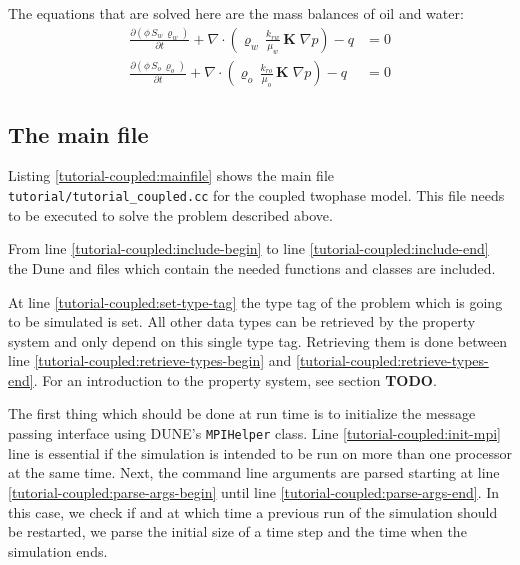 The equations that are solved here are the mass balances of oil and
water:
\begin{align}
  \label{massbalancewater}
  \frac {\partial (\phi \, S_{w}\, \varrho_{w})}{\partial t}
  +
  \nabla \cdot \left( \varrho_{w} \, \frac{k_{rw}}{\mu_{w}} \, \mathbf{K}\;\nabla p \right)
  -
  q
  & =
  0 \\
  \label{massbalanceoil}
  \frac {\partial (\phi \, S_{o}\, \varrho_{o})}{\partial t}
  +
  \nabla \cdot \left( \varrho_{o} \, \frac{k_{ro}}{\mu_{o}} \, \mathbf{K}\;\nabla p \right)
  -
  q 
  & =
  0
\end{align}

\subsection{The main file}

Listing \ref{tutorial-coupled:mainfile} shows the main file
\texttt{tutorial/tutorial\_coupled.cc} for the coupled twophase
model. This file needs to be executed to solve the problem described
above.

\begin{lst}\label{tutorial-coupled:mainfile} \mbox{}
  
\end{lst}

From line \ref{tutorial-coupled:include-begin} to line
\ref{tutorial-coupled:include-end} the Dune and \Dumux files which
contain the needed functions and classes are included.

At line \ref{tutorial-coupled:set-type-tag} the type tag of the
problem which is going to be simulated is set. All other data types
can be retrieved by the \Dumux property system and only depend on this
single type tag. Retrieving them is done between line
\ref{tutorial-coupled:retrieve-types-begin} and
\ref{tutorial-coupled:retrieve-types-end}. For an introduction to the
property system, see section \textbf{TODO}.

The first thing which should be done at run time is to initialize the
message passing interface using DUNE's \texttt{MPIHelper} class. Line
\ref{tutorial-coupled:init-mpi} line is essential if the simulation is
intended to be run on more than one processor at the same time. Next,
the command line arguments are parsed starting at line
\ref{tutorial-coupled:parse-args-begin} until line
\ref{tutorial-coupled:parse-args-end}. In this case, we check if and
at which time a previous run of the simulation should be restarted, we
parse the initial size of a time step and the time when the simulation
ends.

